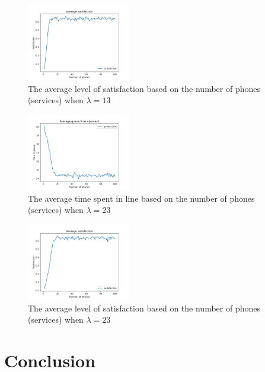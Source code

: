 \documentclass[conference]{IEEEtran}
\begin{document}
\begin{figure}[htbp]
    \centerline{
        \includegraphics[width=0.4\textwidth]{
            figures/satisfaction-13.png
        }
    }
    \caption{
        The average level of satisfaction based on the number of
        phones (services) when $\lambda = 13$
    }
    \label{fig:satisfaction-13}
\end{figure}

\begin{figure}[htbp]
    \centerline{
        \includegraphics[width=0.4\textwidth]{
            figures/queue-time-23.png
        }
    }
    \caption{
        The average time spent in line based on the number of
        phones (services) when $\lambda = 23$
    }
    \label{fig:queue-time-23}
\end{figure}

\begin{figure}[htbp]
    \centerline{
        \includegraphics[width=0.4\textwidth]{
            figures/satisfaction-23.png
        }
    }
    \caption{
        The average level of satisfaction based on the number of
        phones (services) when $\lambda = 23$
    }
    \label{fig:satisfaction-23}
\end{figure}

\section{Conclusion}
\label{sec:conclusion}
\end{document}
